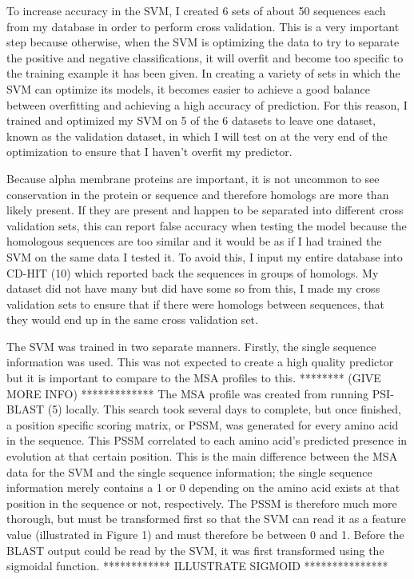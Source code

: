 \documentclass{article}
\begin{document}
To increase accuracy in the SVM, I created 6 sets of about 50 sequences each from my database in order to perform cross validation. This is a very important step because otherwise, when the SVM is optimizing the data to try to separate the positive and negative classifications, it will overfit and become too specific to the training example it has been given. In creating a variety of sets in which the SVM can optimize its models, it becomes easier to achieve a good balance between overfitting and achieving a high accuracy of prediction. For this reason, I trained and optimized my SVM on 5 of the 6 datasets to leave one dataset, known as the validation dataset, in which I will test on at the very end of the optimization to ensure that I haven't overfit my predictor. 

Because alpha membrane proteins are important, it is not uncommon to see conservation in the protein or sequence and therefore homologs are more than likely present. If they are present and happen to be separated into different cross validation sets, this can report false accuracy when testing the model because the homologous sequences are too similar and it would be as if I had trained the SVM on the same data I tested it. To avoid this, I input my entire database into CD-HIT (10) which reported back the sequences in groups of homologs. My dataset did not have many but did have some so from this, I made my cross validation sets to ensure that if there were homologs between sequences, that they would end up in the same cross validation set. 

The SVM was trained in two separate manners. Firstly, the single sequence information was used. This was not expected to create a high quality predictor but it is important to compare to the MSA profiles to this. ******** (GIVE MORE INFO) ************* The MSA profile was created from running PSI-BLAST (5) locally. This search took several days to complete, but once finished, a position specific scoring matrix, or PSSM, was generated for every amino acid in the sequence. This PSSM correlated to each amino acid's predicted presence in evolution at that certain position. This is the main difference between the MSA data for the SVM and the single sequence information; the single sequence information merely contains a 1 or 0 depending on the amino acid exists at that position in the sequence or not, respectively. The PSSM is therefore much more thorough, but must be transformed first so that the SVM can read it as a feature value (illustrated in Figure 1) and must therefore be between 0 and 1. Before the BLAST output could be read by the SVM, it was first transformed using the sigmoidal function. ************ ILLUSTRATE SIGMOID ***************  
\end{document}
